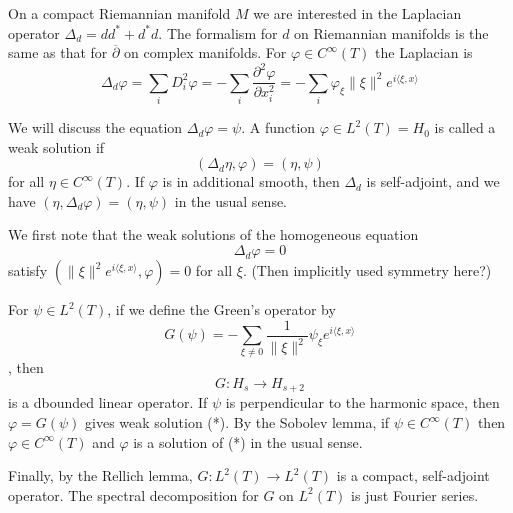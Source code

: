 \documentclass[12pt]{article}
\theoremstyle{plain}
\theoremstyle{definition}
\newcommand{\<}{\langle}
\renewcommand{\>}{\rangle}
\newcommand{\p}{\partial}
\newcommand{\bp}{\overline{\p}}
\begin{document}
On a compact Riemannian manifold $M$ we are interested in the Laplacian operator $\Delta_d = d d^* + d^* d$. The formalism for $d$ on Riemannian manifolds is the same as that for $\bp$ on complex manifolds. For $\varphi \in C^\infty(T)$ the Laplacian is 
$$ \Delta_d \varphi = \sum_{i} D_i^2 \varphi = - \sum_i \frac{\p^2 \varphi}{\p x_i^2} = - \sum_i \varphi_\xi \| \xi \|^2 e^{i \< \xi, x \>} $$

We will discuss the equation $\Delta_d \varphi = \psi$. A function $\varphi \in L^2(T) = H_0$ is called a weak solution if 
$$ (\Delta_d \eta, \varphi) = (\eta, \psi ) $$ 
for all $\eta \in C^\infty(T)$. If $\varphi$ is in additional smooth, then $\Delta_d$ is self-adjoint, and we have $(\eta, \Delta_d \varphi) = (\eta, \psi)$ in the usual sense. 

We first note that the weak solutions of the homogeneous equation 
$$ \Delta_d \varphi = 0 $$ 
satisfy $(\| \xi \|^2 e^{i \< \xi, x \>}, \varphi) = 0$ for all $\xi$. (Then implicitly used symmetry here?)


For $\psi \in L^2(T)$, if we define the Green's operator by 
$$ G(\psi) = - \sum_{\xi \neq 0} \frac{1}{\| \xi \|^2} \psi_\xi e^{i \< \xi, x \>} $$, then $$ G : H_s \to H_{s + 2} $$
is a dbounded linear operator. If $\psi$ is perpendicular to the harmonic space, then $\varphi = G(\psi)$ gives weak solution (*). By the Sobolev lemma, if $\psi \in C^\infty(T)$ then $\varphi \in C^\infty(T)$ and $\varphi$ is a solution of (*) in the usual sense. 

Finally, by the Rellich lemma, $G : L^2(T) \to L^2(T)$ is a compact, self-adjoint operator. The spectral decomposition for $G$ on $L^2(T)$ is just Fourier series. 
\end{document}
